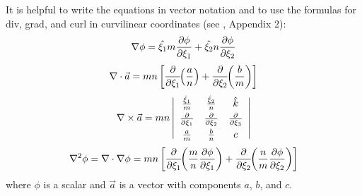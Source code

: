 It is helpful to write the equations in vector notation and to use
the formulas for div, grad, and curl in curvilinear coordinates (see
\cite{Batchelor}, Appendix 2):
\begin{equation}
   \nabla \phi = \hat{\xi_1} m {\partial \phi \over \partial \xi_1} +
                 \hat{\xi_2} n {\partial \phi \over \partial \xi_2}
\end{equation}
\begin{equation}
   \nabla \cdot \vec{a} = mn \left[
   {\partial \over \partial \xi_1} \!\! \left( {a \over n} \right) +
   {\partial \over \partial \xi_2} \!\! \left( {b \over m} \right)
   \right]
\end{equation}
\begin{equation}
   \nabla \times \vec{a} = mn \left| \begin{array}{ccc}
   \vspace{1 mm}
   {\hat{\xi}_1 \over m} & {\hat{\xi}_2 \over n} & \hat{k} \\
   \vspace{1 mm}
   {\partial \over \partial \xi_1} &
   {\partial \over \partial \xi_2} &
   {\partial \over \partial \xi_3} \\
   {a \over m} & {b \over n} & c
   \end{array} \right|
\end{equation}
\begin{equation}
   \nabla^2 \phi = \nabla \cdot \nabla \phi = mn \left[ 
   {\partial \over \partial \xi_1} \!\! \left( {m \over n} 
   {\partial \phi \over \partial \xi_1} \right) +
   {\partial \over \partial \xi_2} \!\! \left( {n \over m} 
   {\partial \phi \over \partial \xi_2} \right) \right]
\end{equation}
where $\phi$ is a scalar and $\vec{a}$ is a vector with components
$a$, $b$, and $c$.

